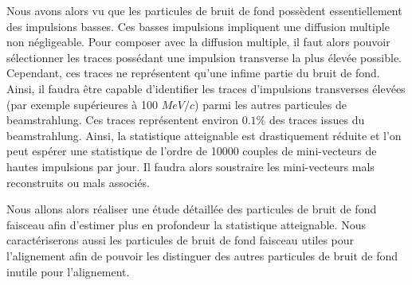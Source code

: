   \medskip
  
  Nous avons alors vu que les particules de bruit de fond possèdent essentiellement des impulsions basses. Ces basses impulsions impliquent une diffusion multiple non n\'egligeable. Pour composer avec la diffusion multiple, il faut alors pouvoir s\'electionner les traces  poss\'edant une impulsion transverse la plus \'elev\'ee possible. Cependant, ces traces ne repr\'esentent qu'une infime partie du bruit de fond. Ainsi, il faudra \^etre capable d'identifier les traces d'impulsions transverses \'elev\'ees (par exemple sup\'erieures \`a 100 $MeV/c$) parmi les autres particules de beamstrahlung. Ces traces repr\'esentent environ $0.1 \%$ des traces issues du beamstrahlung. Ainsi, la statistique atteignable est drastiquement r\'eduite et l'on peut esp\'erer une statistique de l'ordre de 10000 couples de mini-vecteurs de hautes impulsions par jour. Il faudra alors soustraire les mini-vecteurs mals reconstruits ou mals associ\'es.
  
  \medskip

  Nous allons alors r\'ealiser une \'etude d\'etaill\'ee des particules de bruit de fond faisceau afin d'estimer plus en profondeur la statistique atteignable. Nous caract\'eriserons aussi les particules de bruit de fond faisceau utiles pour l'alignement afin de pouvoir les distinguer des autres particules de bruit de fond inutile pour l'alignement.
  
%   

